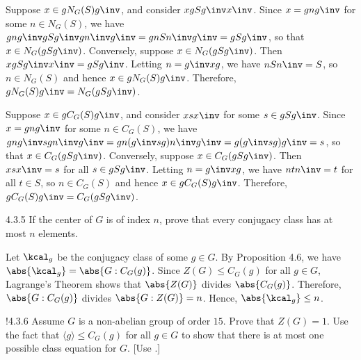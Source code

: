 \begin{sol}
	Suppose $x \in gN_G(S)g\inv$, and consider $xgSg\inv x\inv$.
	Since $x = gng\inv$ for some $n \in N_G(S)$, we have $gng\inv gSg\inv gn\inv g\inv = g n S n\inv g\inv = g S g\inv$, so that $x \in N_G(gSg\inv)$.
	Conversely, suppose $x \in N_G(gSg\inv)$.
	Then $xgSg\inv x\inv = gSg\inv$.
	Letting $n = g\inv x g$, we have $n S n\inv = S$, so $n \in N_G(S)$ and hence $x \in gN_G(S)g\inv$.
	Therefore, $gN_G(S)g\inv = N_G(gSg\inv)$.

	Suppose $x \in gC_G(S)g\inv$, and consider $xsx\inv$ for some $s \in gSg\inv$.
	Since $x = gng\inv$ for some $n \in C_G(S)$, we have $gng\inv s g n\inv g\inv = g n (g\inv s g) n\inv g\inv = g (g\inv s g) g\inv = s$, so that $x \in C_G(gSg\inv)$.
	Conversely, suppose $x \in C_G(gSg\inv)$.
	Then $xsx\inv = s$ for all $s \in gSg\inv$.
	Letting $n = g\inv x g$, we have $n t n\inv = t$ for all $t \in S$, so $n \in C_G(S)$ and hence $x \in gC_G(S)g\inv$.
	Therefore, $gC_G(S)g\inv = C_G(gSg\inv)$.
\end{sol}

\begin{exercise}{4.3.5}
	If the center of $G$ is of index $n$, prove that every conjugacy class has at most $n$ elements.
\end{exercise}

\begin{sol}
	Let $\kcal_g$ be the conjugacy class of some $g \in G$.
	By Proposition 4.6, we have $\abs{\kcal_g} = \abs{G : C_G(g)}$.
	Since $Z(G) \leq C_G(g)$ for all $g \in G$, Lagrange's Theorem shows that $\abs{Z(G)}$ divides $\abs{C_G(g)}$.
	Therefore, $\abs{G : C_G(g)}$ divides $\abs{G : Z(G)} = n$.
	Hence, $\abs{\kcal_g} \leq n$.
\end{sol}

\begin{exercise}!{4.3.6}
	Assume $G$ is a non-abelian group of order $15$.
	Prove that $Z(G)=1$.
	Use the fact that $\langle g \rangle \leq C_G(g)$ for all $g \in G$ to show that there is at most one possible class equation for $G$. [Use .]
\end{exercise}

